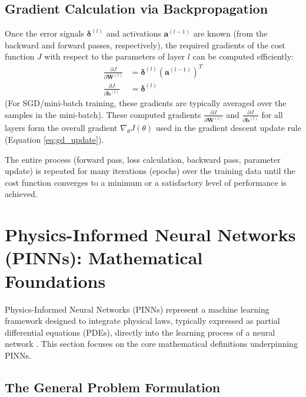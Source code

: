 \documentclass[11pt,twoside,openright]{report}
\begin{document}
\subsection{Gradient Calculation via Backpropagation}
Once the error signals $\bm{\delta}^{(l)}$ and activations $\mathbf{a}^{(l-1)}$ are known (from the backward and forward passes, respectively), the required gradients of the cost function $J$ with respect to the parameters of layer $l$ can be computed efficiently:
\begin{align}
    \frac{\partial J}{\partial \mathbf{W}^{(l)}} &= \bm{\delta}^{(l)} (\mathbf{a}^{(l-1)})^T \label{eq:grad_W} \\
    \frac{\partial J}{\partial \mathbf{b}^{(l)}} &= \bm{\delta}^{(l)} \label{eq:grad_b}
\end{align}
(For SGD/mini-batch training, these gradients are typically averaged over the samples in the mini-batch). These computed gradients $\frac{\partial J}{\partial \mathbf{W}^{(l)}}$ and $\frac{\partial J}{\partial \mathbf{b}^{(l)}}$ for all layers form the overall gradient $\nabla_\theta J(\theta)$ used in the gradient descent update rule (Equation \ref{eq:gd_update}).

The entire process (forward pass, loss calculation, backward pass, parameter update) is repeated for many iterations (epochs) over the training data until the cost function converges to a minimum or a satisfactory level of performance is achieved.





\section{Physics-Informed Neural Networks (PINNs): Mathematical Foundations}

Physics-Informed Neural Networks (PINNs) represent a machine learning framework designed to integrate physical laws, typically expressed as partial differential equations (PDEs), directly into the learning process of a neural network \cite{raissi2019physics}. This section focuses on the core mathematical definitions underpinning PINNs.

\subsection{The General Problem Formulation}
\end{document}
